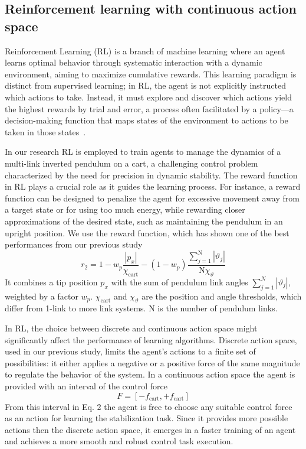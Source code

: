 \subsection{Reinforcement learning with continuous action space}
Reinforcement Learning (RL) is a branch of machine learning where an agent learns optimal behavior through systematic interaction with a dynamic environment, aiming to maximize cumulative rewards. This learning paradigm is distinct from supervised learning; in RL, the agent is not explicitly instructed which actions to take. Instead, it must explore and discover which actions yield the highest rewards by trial and error, a process often facilitated by a policy—a decision-making function that maps states of the environment to actions to be taken in those states~\cite{sutton_reinforcement_2018}.

In our research RL is employed to train agents to manage the dynamics of a multi-link inverted pendulum on a cart, a challenging control problem characterized by the need for precision in dynamic stability. The reward function in RL plays a crucial role as it guides the learning process. For instance, a reward function can be designed to penalize the agent for excessive movement away from a target state or for using too much energy, while rewarding closer approximations of the desired state, such as maintaining the pendulum in an upright position. We use the reward function, which has shown one of the best performances from our previous study
\begin{equation}
r_2 = 1 - w_p \frac{\left|p_x\right|}{\chi_\mathrm{cart}} - (1-w_p) \frac{\sum_{j=1}^\mathrm{N} \left|\vartheta_j\right|}{\mathrm{N} \chi_{\vartheta}} \label{eq:reward2}
\end{equation}
It combines a tip position $p_x$ with the sum of pendulum link angles $\sum_{j=1}^{N} \left|\vartheta_j\right|$, weighted by a factor $w_p$. $\chi_\mathrm{cart}$ and $\chi_{\vartheta}$ are the position and angle thresholds, which differ from 1-link to more link systems. $\mathrm{N}$ is the number of pendulum links.

In RL, the choice between discrete and continuous action space might significantly affect the performance of learning algorithms. Discrete action space, used in our previous study, limits the agent’s actions to a finite set of possibilities: it either applies a negative or a positive force of the same magnitude to regulate the behavior of the system. In a continuous action space the agent is provided with an interval of the control force
\begin{equation}
F = [-f_\mathrm{cart}, +f_\mathrm{cart}]
\label{eq:force}
\end{equation}
From this interval in Eq. 2 the agent is free to choose any suitable control force as an action for learning the stabilization task. Since it provides more possible actions then the discrete action space, it emerges in a faster training of an agent and achieves a more smooth and robust control task execution.  

